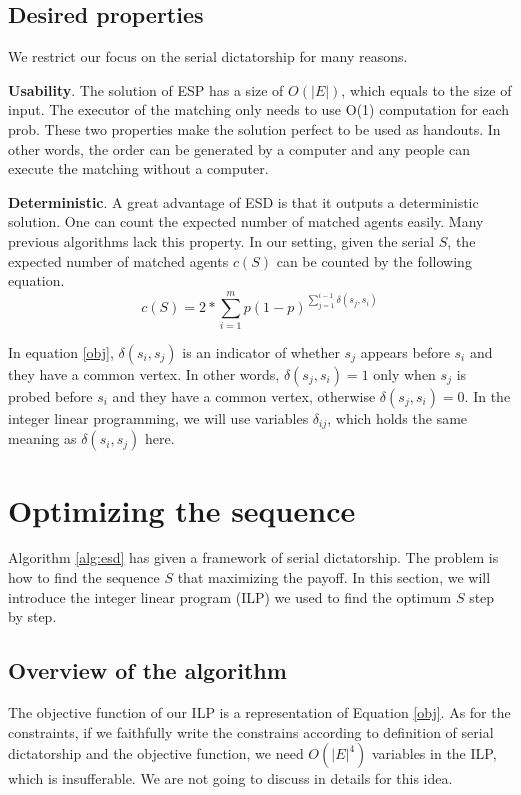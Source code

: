 \documentclass[letterpaper]{article}
\begin{document}
\subsection{Desired properties}

We restrict our focus on the serial dictatorship for many reasons.

\textbf{Usability}. The solution of ESP has a size of $O(|E|)$, which equals to the size of input. The executor of the matching only needs to use O(1) computation for each prob. These two properties make the solution perfect to be used as handouts. In other words, the order can be generated by a computer and any people can execute the matching without a computer.

\textbf{Deterministic}. A great advantage of ESD is that it outputs a deterministic solution. One can count the expected number of matched agents easily. 
Many previous algorithms lack this property.
In our setting, given the serial $S$, the expected number of matched agents $c(S)$ can be counted by the following equation.
\begin{equation}\label{obj}
c(S)=2*\sum_{i=1}^m p(1-p)^{\sum_{j=1}^{i-1}\delta(s_j,s_i)}
\end{equation}

In equation \ref{obj}, $\delta(s_i,s_j)$ is an indicator of whether $s_j$ appears before $s_i$ and they have a common vertex. In other words, $\delta(s_j,s_i)=1$ only when $s_j$ is probed before $s_i$ and they have a common vertex, otherwise  $\delta(s_j,s_i)=0$. 
In the integer linear programming, we will use variables $\delta_{ij}$, which holds the same meaning as $\delta(s_i,s_j)$ here.

\section{Optimizing the sequence}

Algorithm \ref{alg:esd} has given a framework of serial dictatorship. 
The problem is how to find the sequence $S$ that maximizing the payoff.
In this section, we will introduce the integer linear program (ILP) we used to find the optimum $S$ step by step.

\subsection{Overview of the algorithm}

The objective function of our ILP is a representation of Equation \ref{obj}.
As for the constraints, if we faithfully write the constrains according to definition of serial dictatorship and the objective function, we need $O(|E|^4)$ variables in the ILP, which is insufferable. We are not going to discuss in details for this idea.
\end{document}
